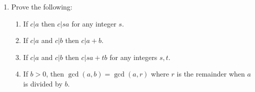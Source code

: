 \documentclass[11pt]{article}
\begin{document}
\begin{enumerate}
\item Prove the following:
\begin{enumerate}
    \item If $c|a$ then $c|sa$ for any integer $s$.
    \item If $c|a$ and $c|b$ then $c|a+b$.
    \item If $c|a$ and $c|b$ then $c|sa+tb$ for any integers $s,t$.
    \item If $b>0$, then $\gcd(a,b)=\gcd(a,r)$ where $r$ is the remainder when $a$ is divided by $b$.
\end{enumerate}
\end{enumerate}
\end{document}
